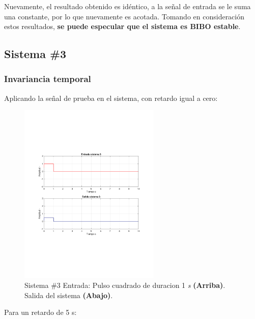			Nuevamente, el resultado obtenido es idéntico, a la señal de entrada se le suma una constante, por lo que nuevamente es acotada. Tomando en consideración estos resultados, \textbf{se puede especular que el sistema es BIBO estable}.

\newpage

	\subsection{Sistema \#3}
		\subsubsection{Invariancia temporal}
			Aplicando la señal de prueba en el sistema, con retardo igual a cero: 
			\begin{figure}[H]
				\center
				\includegraphics[width=0.6\textwidth,clip, trim = {2cm 7.0cm 2.2cm 7.0cm}]{../imgs/sistema_3_invarianza_temporal_noretardo.pdf}
				\caption{Sistema \#3 Entrada: Pulso cuadrado de duracion 1 \textit{s} \textbf{(Arriba)}. Salida del sistema \textbf{(Abajo)}.}
				\label{fig:s_3_time_invariant_test_1}
			\end{figure}
			Para un retardo de 5 s:
